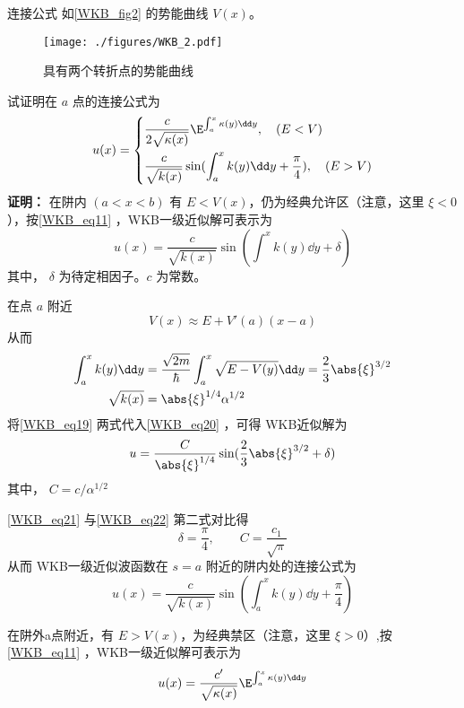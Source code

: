 \begin{example}{连接公式}
如\autoref{WKB_fig2} 的势能曲线 $V(x)$。
\begin{figure}[ht]
\centering
\texttt{[image: ./figures/WKB\_2.pdf]}
\caption{具有两个转折点的势能曲线} \label{WKB_fig2}
\end{figure}
试证明在 $a$ 点的连接公式为
\begin{equation}
u(x)=\left\{\begin{aligned}
&\frac{c}{2\sqrt{\kappa(x)}}\E^{\int_a^x\kappa(y)\dd y} ,\quad(E<V)\\
&\frac{c}{\sqrt{k(x)}}\sin(\int_a^x k(y)\dd y+\frac{\pi}{4}),\quad(E>V)
\end{aligned}\right.
\end{equation}
\textbf{证明：}
在阱内 $(a<x<b)$ 有 $E<V(x)$，仍为经典允许区（注意，这里 $\xi<0$），按\autoref{WKB_eq11} ，WKB一级近似解可表示为
\begin{equation}\label{WKB_eq20}
u(x)=\frac{c}{\sqrt{k(x)}}\sin(\int^x k(y)\dd y+\delta)
\end{equation}
其中， $\delta$ 为待定相因子。$c$ 为常数。

在点 $a$ 附近
\begin{equation}
V(x)\approx E+V'(a)(x-a)
\end{equation}
从而
\begin{equation}\label{WKB_eq19}
\begin{aligned}
\int_a^xk(y)\dd y&=
\frac{\sqrt{2m}}{\hbar}\int_a^x\sqrt{E-V(y)}\dd y=\frac{2}{3}\abs{\xi}^{3/2}
\\
\sqrt{k(x)}
&=
\abs{\xi}^{1/4}\alpha^{1/2}
\end{aligned}
\end{equation}
将\autoref{WKB_eq19} 两式代入\autoref{WKB_eq20} ，可得 WKB近似解为
\begin{equation}\label{WKB_eq21}
u=
\frac{C}{\abs{\xi}^{1/4}}\sin({\frac{2}{3}\abs{\xi}^{3/2}+\delta})
\end{equation}
其中， $C=c/\alpha^{1/2}$

\autoref{WKB_eq21} 与\autoref{WKB_eq22} 第二式对比得
\begin{equation}\label{WKB_eq25}
\delta=\frac{\pi}{4},\qquad C=\frac{c_1}{\sqrt{\pi}}
\end{equation}
从而 WKB一级近似波函数在 $s=a$ 附近的阱内处的连接公式为
\begin{equation}
u(x)=\frac{c}{\sqrt{k(x)}}\sin(\int_a^x k(y)\dd y+\frac{\pi}{4})
\end{equation}

在阱外a点附近，有 $E>V(x)$，为经典禁区（注意，这里 $\xi>0$）,按\autoref{WKB_eq11} ，WKB一级近似解可表示为
\begin{equation}
u(x)=\frac{c'}{\sqrt{\kappa(x)}}\E^{\int_a^x\kappa(y)\dd y}
\end{equation}



\end{example}
